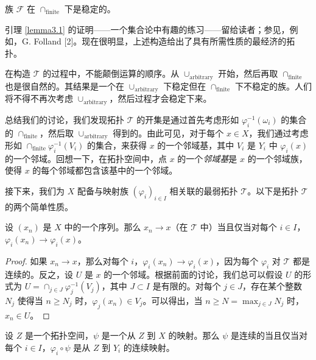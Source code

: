 \begin{lemma}\label{lemma3.1}
族 $\mathcal{F}$ 在 $\cap_{\text{finite}}$ 下是稳定的。
\end{lemma}

引理 \ref{lemma3.1} 的证明——一个集合论中有趣的练习——留给读者；参见，例如，G. Folland [2]。现在很明显，上述构造给出了具有所需性质的最经济的拓扑。

\begin{remark}\label{remark3.1}
在构造 $\mathcal{T}$ 的过程中，不能颠倒运算的顺序。从 $\cup_{\text{arbitrary}}$ 开始，然后再取 $\cap_{\text{finite}}$ 也是很自然的。其结果是一个在 $\cup_{\text{arbitrary}}$ 下稳定但在 $\cap_{\text{finite}}$ 下不稳定的族。人们将不得不再次考虑 $\cup_{\text{arbitrary}}$，然后过程才会稳定下来。
\end{remark}

总结我们的讨论，我们发现拓扑 $\mathcal{T}$ 的开集是通过首先考虑形如 $\varphi_i^{-1}(\omega_i)$ 的集合的 $\cap_{\text{finite}}$，然后取 $\cup_{\text{arbitrary}}$ 得到的。由此可见，对于每个 $x \in X$，我们通过考虑形如 $\cap_{\text{finite}} \varphi_i^{-1}(V_i)$ 的集合，来获得 $x$ 的一个邻域基，其中 $V_i$ 是 $Y_i$ 中 $\varphi_i(x)$ 的一个邻域。回想一下，在拓扑空间中，点 $x$ 的一个\textit{邻域基}是 $x$ 的一个邻域族，使得 $x$ 的每个邻域都包含该基中的一个邻域。

接下来，我们为 $X$ 配备与映射族 $(\varphi_i)_{i \in I}$ 相关联的最弱拓扑 $\mathcal{T}$。以下是拓扑 $\mathcal{T}$ 的两个简单性质。

\begin{proposition}\label{prop3.1}
设 $(x_n)$ 是 $X$ 中的一个序列。那么 $x_n \to x$（在 $\mathcal{T}$ 中）当且仅当对每个 $i \in I$，$\varphi_i(x_n) \to \varphi_i(x)$。
\end{proposition}

\begin{proof}
如果 $x_n \to x$，那么对每个 $i$，$\varphi_i(x_n) \to \varphi_i(x)$，因为每个 $\varphi_i$ 对 $\mathcal{T}$ 都是连续的。反之，设 $U$ 是 $x$ 的一个邻域。根据前面的讨论，我们总可以假设 $U$ 的形式为 $U = \cap_{j \in J} \varphi_j^{-1}(V_j)$，其中 $J \subset I$ 是有限的。对每个 $j \in J$，存在某个整数 $N_j$ 使得当 $n \ge N_j$ 时，$\varphi_j(x_n) \in V_j$。可以得出，当 $n \ge N = \max_{j \in J} N_j$ 时，$x_n \in U$。
\end{proof}

\begin{proposition}\label{prop3.2}
设 $Z$ 是一个拓扑空间，$\psi$ 是一个从 $Z$ 到 $X$ 的映射。那么 $\psi$ 是连续的当且仅当对每个 $i \in I$，$\varphi_i \circ \psi$ 是从 $Z$ 到 $Y_i$ 的连续映射。
\end{proposition}

